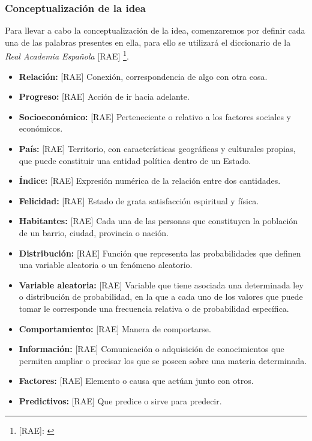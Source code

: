 \newpage
\subsubsection{Conceptualización de la idea}

Para llevar a cabo la conceptualización de la idea, comenzaremos por definir cada una de las palabras presentes en ella, para ello se utilizará el diccionario de la \textit{Real Academia Española} [RAE] \footnote{[RAE]: \cite{rae}}.

\begin{itemize}
    \item \textbf{Relación:} [RAE] Conexión, correspondencia de algo con otra cosa. 
    
    \item \textbf{Progreso:} [RAE] Acción de ir hacia adelante.

    \item \textbf{Socioeconómico:} [RAE] Perteneciente o relativo a los factores sociales y económicos.
    
    \item \textbf{País:} [RAE] Territorio, con características geográficas y culturales propias, que puede constituir una entidad política dentro de un Estado.

    \item \textbf{Índice:} [RAE] Expresión numérica de la relación entre dos cantidades.

    \item \textbf{Felicidad:} [RAE] Estado de grata satisfacción espiritual y física.

    \item \textbf{Habitantes:} [RAE] Cada una de las personas que constituyen la población de un barrio, ciudad, provincia o nación.

    \item \textbf{Distribución:} [RAE] Función que representa las probabilidades que definen una variable aleatoria o un fenómeno aleatorio.

    \item \textbf{Variable aleatoria:} [RAE] Variable que tiene asociada una determinada ley o distribución de probabilidad, en la que a cada uno de los valores que puede tomar le corresponde una frecuencia relativa o de probabilidad específica. 

    \item \textbf{Comportamiento:} [RAE] Manera de comportarse. 

    \item \textbf{Información:} [RAE] Comunicación o adquisición de conocimientos que permiten ampliar o precisar los que se poseen sobre una materia determinada.

    \item \textbf{Factores:} [RAE] Elemento o causa que actúan junto con otros.

    \item \textbf{Predictivos:} [RAE] Que predice o sirve para predecir.
    
\end{itemize}


